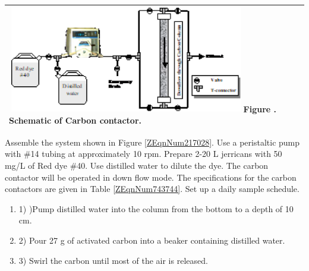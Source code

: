 \documentclass{article} %
\begin{document}
\begin{tabular}{|p{2.8in}|} \hline 
\includegraphics*[width=4.11in, height=1.83in, keepaspectratio=false]{image2}\newline Figure \label{ZEqnNum217028}. Schematic of Carbon contactor.\newline  \\ \hline 
\end{tabular}

Assemble the system shown in Figure \eqref{ZEqnNum217028}. Use a peristaltic pump with \#14 tubing at approximately 10 rpm. Prepare 2-20 L jerricans with 50 mg/L of Red dye \#40. Use distilled water to dilute the dye. The carbon contactor will be operated in down flow mode. The specifications for the carbon contactors are given in Table \eqref{ZEqnNum743744}. Set up a daily sample schedule. 

\noindent \begin{enumerate}
\item 1) )Pump distilled water into the column from the bottom to a depth of 10 cm.

\noindent \item 2) Pour 27 g of activated carbon into a beaker containing distilled water.

\noindent \item 3) Swirl the carbon until most of the air is released.
\end{enumerate}
\end{document}
